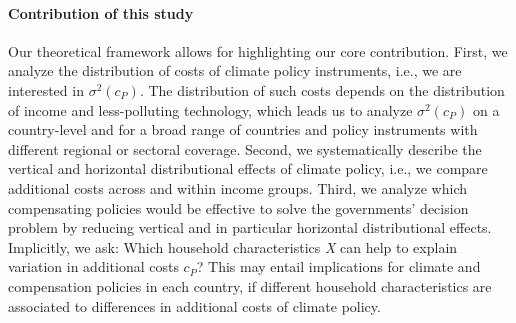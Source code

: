 \documentclass[12pt, a4paper]{article}
\begin{document}
\paragraph{Contribution of this study}
Our theoretical framework allows for highlighting our core contribution. First, we analyze the distribution of costs of climate policy instruments, i.e., we are interested in $\sigma^{2}(c_{P})$. The distribution of such costs depends on the distribution of income and less-polluting technology, which leads us to analyze $\sigma^{2}(c_{P})$ on a country-level and for a broad range of countries and policy instruments with different regional or sectoral coverage. Second, we systematically describe the vertical and horizontal distributional effects of climate policy, i.e., we compare additional costs across and within income groups. Third, we analyze which compensating policies would be effective to solve the governments' decision problem by reducing vertical and in particular horizontal distributional effects. Implicitly, we ask: Which household characteristics \textit{X} can help to explain variation in additional costs $c_{P}$? This may entail implications for climate and compensation policies in each country, if different household characteristics are associated to differences in additional costs of climate policy.    



\end{document}
